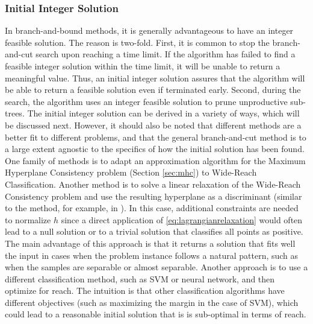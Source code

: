 \documentclass[11pt]{article}
\theoremstyle{definition}
\begin{document}
\subsubsection{Initial Integer Solution}
\label{sec:rndinit}
In branch-and-bound methods, it is generally advantageous to have 
an integer feasible solution. 
The reason is two-fold.
First, it is common to stop the branch-and-cut search upon reaching a time limit. 
If the algorithm has failed to find a feasible integer solution
within the time limit, it will be unable to return a meaningful value.
Thus, an initial integer solution assures that the algorithm will be able to
return a feasible solution even if terminated early.
Second, during the search, the algorithm uses an integer feasible solution
to prune unproductive sub-trees.
The initial integer solution can be derived in a variety of ways, which
will be discussed next. 
However, it should also be noted that different methods are a better fit to
different problems, and that the general branch-and-cut method is to a
large extent agnostic to the specifics of how the initial solution has been found.
One family of methods is to adapt an approximation algorithm for the 
Maximum Hyperplane Consistency problem (Section \ref{sec:mhc})
to Wide-Reach Classification.
Another method is to solve a linear relaxation of the Wide-Reach Consistency
problem and use the resulting hyperplane  
as a discriminant (similar to the method, for example, in \cite{approximation}).
In this case, additional constraints are needed to normalize $h$ 
since a direct application of \eqref{eq:lagrangianrelaxation} would often
lead to a null solution or to a trivial solution that classifies 
all points as positive.
The main advantage of this approach is that it returns a solution that 
fits well the input in cases when the problem instance follows a natural pattern,
such as when the samples are separable or almost separable.
Another approach is to use a different classification method,
such as SVM \cite{statisticallearning} or neural network, and 
then optimize for reach.
The intuition is that other classification algorithms have
different objectives (such as maximizing the margin in the case of SVM),
which could lead to a reasonable initial solution that is is sub-optimal
in terms of reach.
\end{document}
